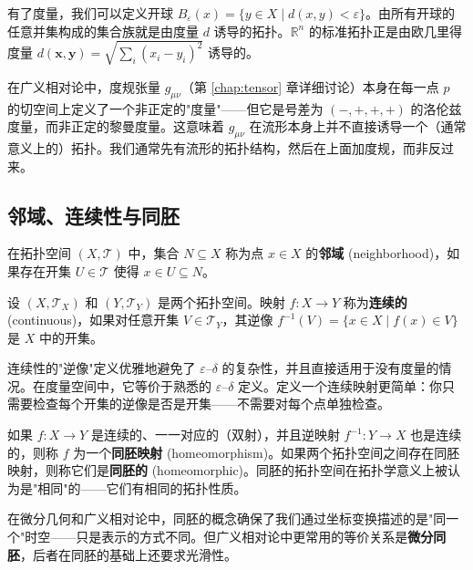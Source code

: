 有了度量，我们可以定义开球 $B_\varepsilon(x) = \{y \in X \mid d(x, y) < \varepsilon\}$。由所有开球的任意并集构成的集合族就是由度量 $d$ 诱导的拓扑。$\mathbb{R}^n$ 的标准拓扑正是由欧几里得度量 $d(\mathbf{x}, \mathbf{y}) = \sqrt{\sum_i (x_i - y_i)^2}$ 诱导的。


在广义相对论中，度规张量 $g_{\mu\nu}$（第 \ref{chap:tensor} 章详细讨论）本身在每一点 $p$ 的切空间上定义了一个非正定的"度量"——但它是号差为 $(-,+,+,+)$ 的洛伦兹度量，而非正定的黎曼度量。这意味着 $g_{\mu\nu}$ 在流形本身上并不直接诱导一个（通常意义上的）拓扑。我们通常先有流形的拓扑结构，然后在上面加度规，而非反过来。

\subsection{邻域、连续性与同胚}

\begin{definition}[邻域]
在拓扑空间 $(X, \mathcal{T})$ 中，集合 $N \subseteq X$ 称为点 $x \in X$ 的\textbf{邻域} (neighborhood)，如果存在开集 $U \in \mathcal{T}$ 使得 $x \in U \subseteq N$。
\end{definition}

\begin{definition}[连续映射]
设 $(X, \mathcal{T}_X)$ 和 $(Y, \mathcal{T}_Y)$ 是两个拓扑空间。映射 $f: X \to Y$ 称为\textbf{连续的} (continuous)，如果对任意开集 $V \in \mathcal{T}_Y$，其逆像 $f^{-1}(V) = \{x \in X \mid f(x) \in V\}$ 是 $X$ 中的开集。
\end{definition}

\begin{remark}[逆像定义的好处]
连续性的"逆像"定义优雅地避免了 $\varepsilon$--$\delta$ 的复杂性，并且直接适用于没有度量的情况。在度量空间中，它等价于熟悉的 $\varepsilon$--$\delta$ 定义。定义一个连续映射更简单：你只需要检查每个开集的逆像是否是开集——不需要对每个点单独检查。
\end{remark}

\begin{definition}[同胚]
如果 $f: X \to Y$ 是连续的、一一对应的（双射），并且逆映射 $f^{-1}: Y \to X$ 也是连续的，则称 $f$ 为一个\textbf{同胚映射} (homeomorphism)。如果两个拓扑空间之间存在同胚映射，则称它们是\textbf{同胚的} (homeomorphic)。同胚的拓扑空间在拓扑学意义上被认为是"相同"的——它们有相同的拓扑性质。
\end{definition}

\begin{remark}
在微分几何和广义相对论中，同胚的概念确保了我们通过坐标变换描述的是"同一个"时空——只是表示的方式不同。但广义相对论中更常用的等价关系是\textbf{微分同胚}，后者在同胚的基础上还要求光滑性。
\end{remark}

